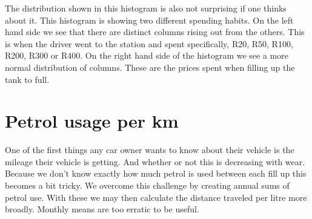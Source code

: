 \documentclass[]{book}
\newenvironment{Shaded}{\begin{snugshade}}{\end{snugshade}}
\newcommand{\KeywordTok}[1]{\textcolor[rgb]{0.13,0.29,0.53}{\textbf{{#1}}}}
\newcommand{\DataTypeTok}[1]{\textcolor[rgb]{0.13,0.29,0.53}{{#1}}}
\newcommand{\DecValTok}[1]{\textcolor[rgb]{0.00,0.00,0.81}{{#1}}}
\newcommand{\StringTok}[1]{\textcolor[rgb]{0.31,0.60,0.02}{{#1}}}
\newcommand{\CommentTok}[1]{\textcolor[rgb]{0.56,0.35,0.01}{\textit{{#1}}}}
\newcommand{\NormalTok}[1]{{#1}}
\theoremstyle{definition}
\theoremstyle{definition}
\theoremstyle{remark}
\begin{document}
The distribution shown in this histogram is also not surprising if one
thinks about it. This histogram is showing two different spending
habits. On the left hand side we see that there are distinct columns
rising out from the others. This is when the driver went to the station
and spent specifically, R20, R50, R100, R200, R300 or R400. On the right
hand side of the histogram we see a more normal distribution of columns.
These are the prices spent when filling up the tank to full.

\section{Petrol usage per km}\label{petrol-usage-per-km}

One of the first things any car owner wants to know about their vehicle
is the mileage their vehicle is getting. And whether or not this is
decreasing with wear. Because we don't know exactly how much petrol is
used between each fill up this becomes a bit tricky. We overcome this
challenge by creating annual sums of petrol use. With these we may then
calculate the distance traveled per litre more broadly. Monthly means
are too erratic to be useful.

\begin{Shaded}
\end{Shaded}
\end{document}

